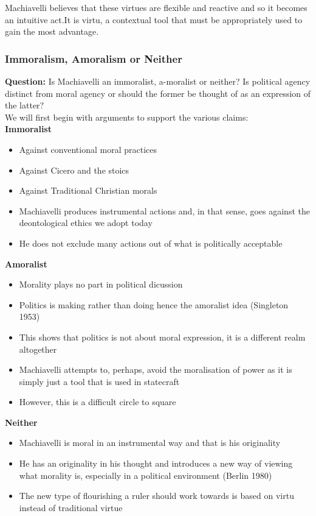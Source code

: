 \documentclass[12pt, letterpaper]{article}
\begin{document}
Machiavelli believes that these virtues are flexible and reactive and so it becomes an intuitive act.It is virtu, a contextual tool that must be appropriately used to gain the most advantage.

\subsubsection{Immoralism, Amoralism or Neither}
\textbf{Question:} Is Machiavelli an immoralist, a-moralist or neither? Is political agency distinct from moral agency or should the former be thought of as an expression of the latter?\\
We will first begin with arguments to support the various claims:\\
\textbf{Immoralist}
\begin{itemize}
	\item Against conventional moral practices
	\item Against Cicero and the stoics
	\item Against Traditional Christian morals
	\item Machiavelli produces instrumental actions and, in that sense, goes against the deontological ethics we adopt today
	\item He does not exclude many actions out of what is politically acceptable
\end{itemize}
\textbf{Amoralist}
\begin{itemize}
	\item Morality plays no part in political dicussion
	\item Politics is making rather than doing hence the amoralist idea (Singleton 1953)
	\item This shows that politics is not about moral expression, it is a different realm altogether
	\item Machiavelli attempts to, perhaps, avoid the moralisation of power as it is simply just a tool that is used in statecraft
	\item However, this is a difficult circle to square
\end{itemize}
\textbf{Neither}
\begin{itemize}
	\item Machiavelli is moral in an instrumental way and that is his originality
	\item He has an originality in his thought and introduces a new way of viewing what morality is, especially in a political environment (Berlin 1980)
	\item The new type of flourishing a ruler should work towards is based on virtu instead of traditional virtue
\end{itemize}
\end{document}
